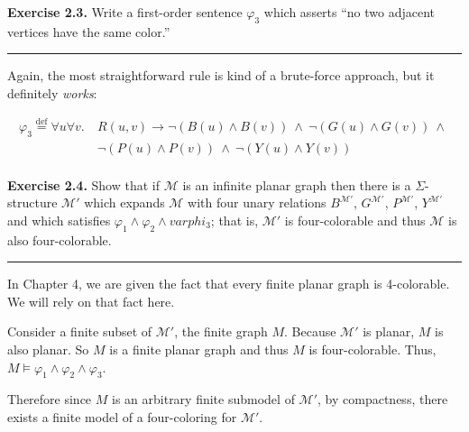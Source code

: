 \documentclass{article}
\newcommand{\Break}{\vspace{0.2cm}\hrule{}\vspace{0.2cm}}
\newcommand{\defas}{\overset{\text{def}}{=}}
\newcommand{\scrM}{\mathcal{M}}
\begin{document}
\vspace{2cm}

\noindent\textbf{Exercise 2.3.} Write a first-order sentence $\varphi_3$ which
asserts ``no two adjacent vertices have the same color.''

\Break{}

Again, the most straightforward rule is kind of a brute-force approach, but it
definitely \textit{works}:

\begin{align*}
  \varphi_3 \defas \forall u \forall v.~ &R(u, v) \to \lnot(B(u) \wedge B(v))
  ~\wedge~ \lnot(G(u) \wedge G(v)) ~\wedge~ \\
  &\lnot(P(u) \wedge P(v)) ~\wedge~ \lnot(Y(u) \wedge Y(v)) \\
\end{align*}

\newpage{}

\noindent\textbf{Exercise 2.4.} Show that if $\scrM$ is an infinite
planar graph then there is a $\Sigma$-structure $\scrM\prime$ which
expands $\scrM$ with four unary relations $B^{\scrM\prime}$, $G^{\scrM\prime}$,
$P^{\scrM\prime}$, $Y^{\scrM\prime}$ and which satisfies $\varphi_1 \wedge
\varphi_2 \wedge varphi_3$; that is, $\scrM\prime$ is four-colorable and thus
$\scrM$ is also four-colorable.

\Break{}

In Chapter 4, we are given the fact that every finite planar graph is
4-colorable. We will rely on that fact here.

Consider a finite subset of $\scrM\prime$, the finite graph $M$. Because
$\scrM\prime$ is planar, $M$ is also planar. So $M$ is a finite planar graph
and thus $M$ is four-colorable. Thus, $M \vDash \varphi_1 \wedge \varphi_2
\wedge \varphi_3$.

Therefore since $M$ is an arbitrary finite submodel of $\scrM\prime$, by
compactness, there exists a finite model of a four-coloring for $\scrM\prime$.
\end{document}
